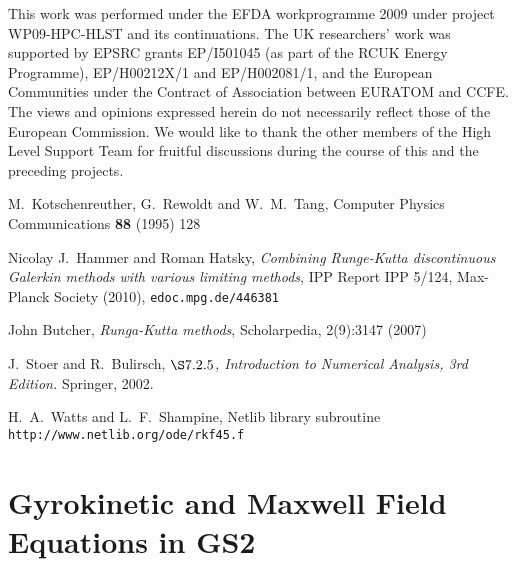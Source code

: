 \documentclass[10pt,a4paper]{article}
\begin{document}
This work was performed under the EFDA workprogramme 2009 under project
WP09-HPC-HLST and its continuations. The UK researchers' work was supported by
EPSRC grants EP/I501045 (as part of the RCUK Energy Programme), EP/H00212X/1
and EP/H002081/1, and the European Communities under the Contract of
Association between EURATOM and CCFE\@. The views and opinions expressed
herein do not necessarily reflect those of the European Commission. We would
like to thank the other members of the High Level Support Team for fruitful
discussions during the course of this and the preceding projects.

\begin{thebibliography}{99}

M.~Kotschenreuther, G.~Rewoldt and W.~M.~Tang, Computer Physics
  Communications \textbf{88} (1995) 128

Nicolay J.~Hammer and Roman Hatsky, \textit{Combining Runge-Kutta
  discontinuous Galerkin methods with various limiting methods}, IPP Report
IPP 5/124, Max-Planck Society (2010), \texttt{edoc.mpg.de/446381}

John Butcher, \textit{Runga-Kutta methods}, Scholarpedia, 2(9):3147 (2007)

J.~Stoer and R.~Bulirsch, \textit{$\S 7.2.5$, Introduction to Numerical Analysis, 3rd
  Edition.} Springer, 2002.

H.~A.~Watts and L.~F.~Shampine, Netlib library subroutine
\texttt{http://www.netlib.org/ode/rkf45.f}




\end{thebibliography}

\newpage
\appendix

\section{Gyrokinetic and Maxwell Field Equations in GS2}
\end{document}
